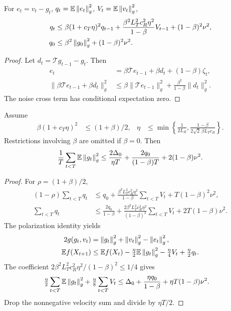 \begin{lemma}
For $e_t=v_t-g_t$, $q_t=\mathbb E\left\lVert e_t\right\rVert_g^2$, $V_t=\mathbb E\left\lVert v_t\right\rVert_g^2$,
\begin{align}
q_t&\leq\beta(1+c_T\eta)^2q_{t-1}
+\frac{\beta^2L_T^2c_R^2\eta^2}{1-\beta}V_{t-1}
+(1-\beta)^2\nu^2,\\
q_0&\leq\beta^2\left\lVert g_0\right\rVert_g^2+(1-\beta)^2\nu^2 .
\label{eq:rigid-momentum-track}
\end{align}
\end{lemma}
\begin{proof}
Let $d_t=\mathcal T g_{t-1}-g_t$. Then
\begin{align}
e_t&=\beta\mathcal T e_{t-1}+\beta d_t+(1-\beta)\zeta_t,\\
\|\beta\mathcal T e_{t-1}+\beta d_t\|_g^2
&\leq\beta\|\mathcal T e_{t-1}\|_g^2
+\frac{\beta^2}{1-\beta}\|d_t\|_g^2 .
\end{align}
The noise cross term has conditional expectation zero.
\end{proof}

\begin{theorem}
\label{thm:momentum}
Assume
\begin{align}
\beta(1+c_T\eta)^2&\leq(1+\beta)/2,&
\eta&\leq\min\left\{\frac1{2L_R},
\frac{1-\beta}{2\sqrt2\,\beta L_Tc_R}\right\}.
\label{eq:rigid-momentum-step}
\end{align}
Restrictions involving $\beta$ are omitted if $\beta=0$. Then
\begin{equation}
\frac1T\sum_{t<T}\mathbb E\left\lVert g_t\right\rVert_g^2
\leq\frac{2\Delta_0}{\eta T}
+\frac{2q_0}{(1-\beta)T}+2(1-\beta)\nu^2 .
\label{eq:rigid-momentum-rate}
\end{equation}
\end{theorem}
\begin{proof}
For $\rho=(1+\beta)/2$,
\begin{align}
(1-\rho)\sum_{t<T}q_t
&\leq q_0+
\frac{\beta^2L_T^2c_R^2\eta^2}{1-\beta}\sum_{t<T}V_t
+T(1-\beta)^2\nu^2,\\
\sum_{t<T}q_t
&\leq\frac{2q_0}{1-\beta}
+\frac{2\beta^2L_T^2c_R^2\eta^2}{(1-\beta)^2}
\sum_{t<T}V_t+2T(1-\beta)\nu^2.
\end{align}
The polarization identity yields
\begin{align}
2g(g_t,v_t)&=\left\lVert g_t\right\rVert_g^2+\left\lVert v_t\right\rVert_g^2-\left\lVert e_t\right\rVert_g^2,\\
\mathbb E f(X_{t+1})
&\leq\mathbb E f(X_t)-\tfrac\eta2\mathbb E\left\lVert g_t\right\rVert_g^2
-\tfrac\eta4 V_t+\tfrac\eta2q_t .
\end{align}
The coefficient
$2\beta^2L_T^2c_R^2\eta^2/(1-\beta)^2\leq1/4$ gives
\begin{align}
\tfrac\eta2\sum_{t<T}\mathbb E\left\lVert g_t\right\rVert_g^2
+\tfrac\eta8\sum_{t<T}V_t
&\leq\Delta_0+\frac{\eta q_0}{1-\beta}
+\eta T(1-\beta)\nu^2 .
\end{align}
Drop the nonnegative velocity sum and divide by $\eta T/2$.
\end{proof}

